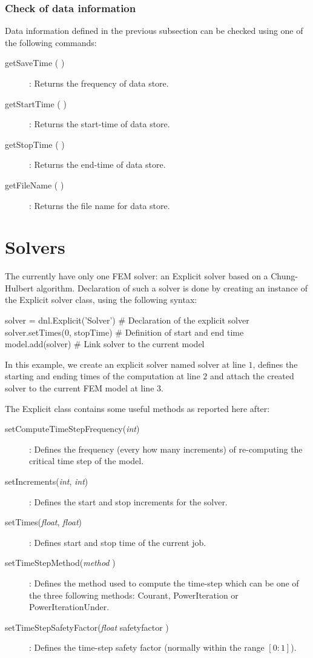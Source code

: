 \subsubsection{Check of data information}
Data information defined in the previous subsection can be checked using one of the following commands:
\begin{description}
\item [{getSaveTime ( )}] : Returns the frequency of data store.
\item [{getStartTime ( )}] : Returns the start-time of data store. 
\item [{getStopTime ( )}] : Returns the end-time of data store.
\item [{getFileName ( )}] : Returns the file name for data store.
\end{description}

\section{Solvers}
The \DynELA currently have only one FEM solver: an Explicit solver based on a Chung-Hulbert algorithm. Declaration of such a solver is done by creating an instance of the \textsf{Explicit} solver class, using the following syntax:
\begin{PythonListing}
solver = dnl.Explicit('Solver') # Declaration of the explicit solver
solver.setTimes(0, stopTime)    # Definition of start and end time
model.add(solver)               # Link solver to the current model
\end{PythonListing}
In this example, we create an explicit solver named solver at line $1$, defines the starting and ending times of the computation at line $2$ and attach the created solver to the current FEM model at line $3$.

The Explicit class contains some useful methods as reported here after:
\begin{description}
\item [{setComputeTimeStepFrequency(\emph{int})}] : Defines the frequency (\ie every how many increments) of re-computing the critical time step of the model.
\item [{setIncrements(\emph{int}, \emph{int})}] : Defines the start and stop increments for the solver.
\item [{setTimes(\emph{float}, \emph{float})}] : Defines start and stop time of the current job.
\item [{setTimeStepMethod(\emph{method} )}] : Defines the method used to compute the time-step which can be one of the three following methods: \textsf{Courant}, \textsf{PowerIteration} or \textsf{PowerIterationUnder}.
\item [{setTimeStepSafetyFactor(\emph{float} safetyfactor )}] : Defines the time-step safety factor (normally within the range  $[0:1]$).
\end{description}

